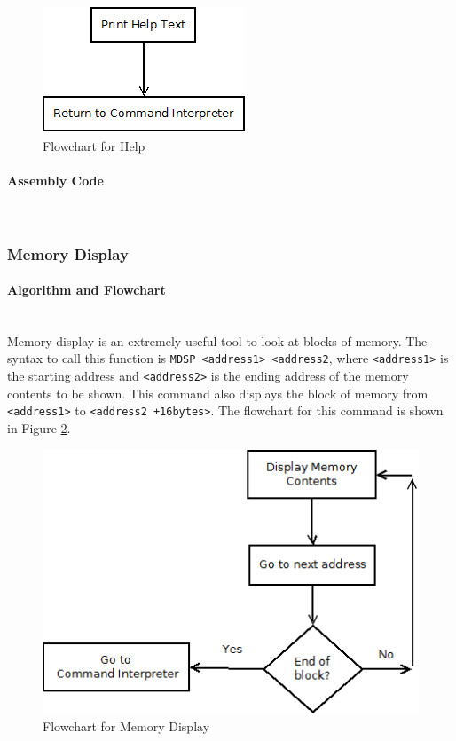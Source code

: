 \documentclass[12pt]{article}
\begin{document}
			\begin{figure}[H]
				\centering
				\includegraphics[width=0.4\linewidth]{help}
				\caption{Flowchart for Help}
				\label{fig:help}
			\end{figure}
			
			\paragraph{Assembly Code}~\\
			\subsubsection{Memory Display}
			\paragraph{Algorithm and Flowchart}~\\
			Memory display is an extremely useful tool to look at blocks of memory. The syntax to call this function is \texttt{MDSP <address1> <address2}, where \texttt{<address1>} is the starting address and \texttt{<address2>} is the ending address of the memory contents to be shown. This command also displays the block of memory from \texttt{<address1>} to \texttt{<address2 +16bytes>}. The flowchart for this command is shown in Figure \ref{fig:memdsp}.
				
			\begin{figure}[H]
				\centering
				\includegraphics[width=.7\linewidth]{memdsp}
				\caption{Flowchart for Memory Display}
				\label{fig:memdsp}
			\end{figure}
			
\end{document}
